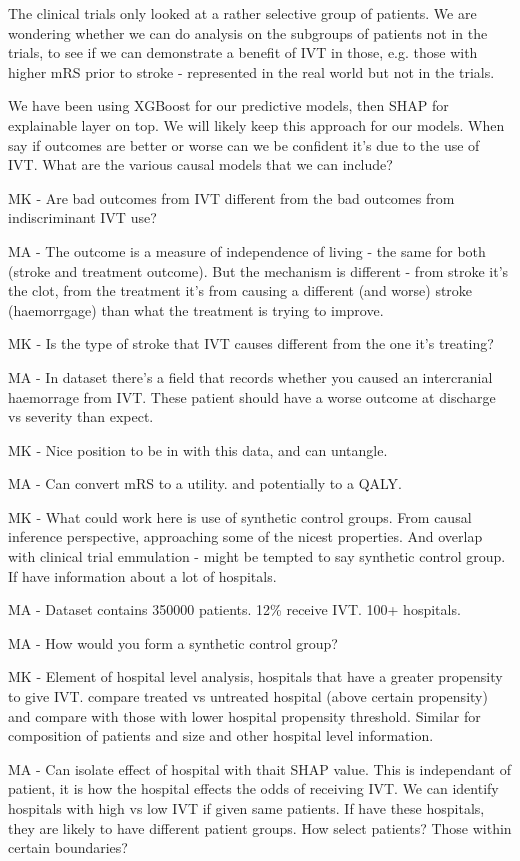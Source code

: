 The clinical trials only looked at a rather selective group of patients. We are wondering whether we can do analysis on the subgroups of patients not in the trials, to see if we can demonstrate a benefit of IVT in those, e.g. those with higher mRS prior to stroke - represented in the real world but not in the trials.

We have been using XGBoost for our predictive models, then SHAP for explainable layer on top. We will likely keep this approach for our models. When say if outcomes are better or worse can we be confident it's due to the use of IVT. What are the various causal models that we can include?

MK - Are bad outcomes from IVT different from the bad outcomes from indiscriminant IVT use?

MA - The outcome is a measure of independence of living - the same for both (stroke and treatment outcome). But the mechanism is different - from stroke it's the clot, from the treatment it's from causing a different (and worse) stroke (haemorrgage) than what the treatment is trying to improve.

MK - Is the type of stroke that IVT causes different from the one it's treating?

MA - In dataset there's a field that records whether you caused an intercranial haemorrage from IVT. These patient should have a worse outcome at discharge vs severity than expect.

MK - Nice position to be in with this data, and can untangle.

MA - Can convert mRS to a utility. and potentially to a QALY.

MK - What could work here is use of synthetic control groups. From causal inference perspective, approaching some of the nicest properties. And overlap with clinical trial emmulation - might be tempted to say synthetic control group. If have information about a lot of hospitals.

MA - Dataset contains 350000 patients. 12\% receive IVT. 100+ hospitals.

MA - How would you form a synthetic control group?

MK - Element of hospital level analysis, hospitals that have a greater propensity to give IVT. compare treated vs untreated hospital (above certain propensity) and compare with those with lower hospital propensity threshold. Similar for composition of patients and size and other hospital level information.

MA - Can isolate effect of hospital with thait SHAP value. This is independant of patient, it is how the hospital effects the odds of receiving IVT. We can identify hospitals with high vs low IVT if given same patients. If have these hospitals, they are likely to have different patient groups. How select patients? Those within certain boundaries?

